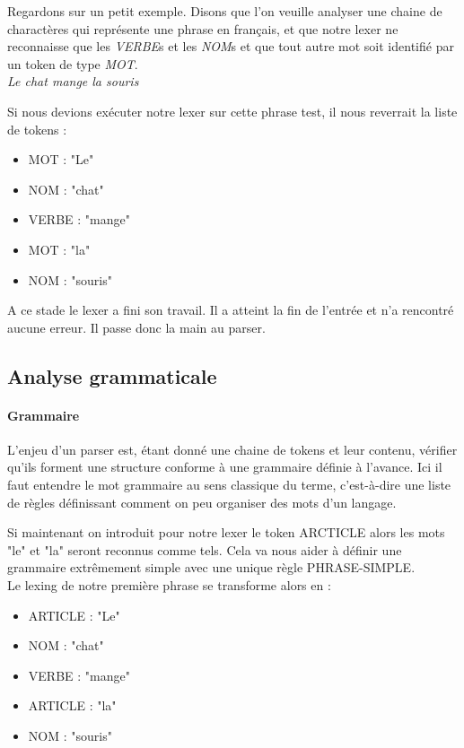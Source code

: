\documentclass[14pt,a4paper]{article}
\begin{document}
	Regardons sur un petit exemple. Disons que l'on veuille analyser une chaine de charactères qui représente une phrase en français, et que notre lexer ne reconnaisse que les \textit{VERBE}s et les \textit{NOM}s et que tout autre mot soit identifié par un token de type \textit{MOT}.	
	$$ $$
	\textit{Le chat mange la souris}

	Si nous devions exécuter notre lexer sur cette phrase test, il nous reverrait la liste de tokens :
	
	\begin{itemize}
		\item MOT : "Le"
		\item NOM : "chat"
		\item VERBE : "mange"
		\item MOT : "la"
		\item NOM : "souris"
	\end{itemize}

	A ce stade le lexer a fini son travail. Il a atteint la fin de l'entrée et n'a rencontré aucune erreur. Il passe donc la main au parser.
	
	\subsection{Analyse grammaticale}
	
	\paragraph{Grammaire}
	
	L'enjeu d'un parser est, étant donné une chaine de tokens et leur contenu, vérifier qu'ils forment une structure conforme à une grammaire définie à l'avance. Ici il faut entendre le mot grammaire au sens classique du terme, c'est-à-dire une liste de règles définissant comment on peu organiser des mots d'un langage.
	
	Si maintenant on introduit pour notre lexer le token ARCTICLE alors les mots "le" et "la" seront reconnus comme tels. Cela va nous aider à définir une grammaire extrêmement simple avec une unique règle PHRASE-SIMPLE.\\
	 
	Le lexing de notre première phrase se transforme alors en :
	
	\begin{itemize}
		\item ARTICLE : "Le"
		\item NOM : "chat"
		\item VERBE : "mange"
		\item ARTICLE : "la"
		\item NOM : "souris"
	\end{itemize}
\end{document}
